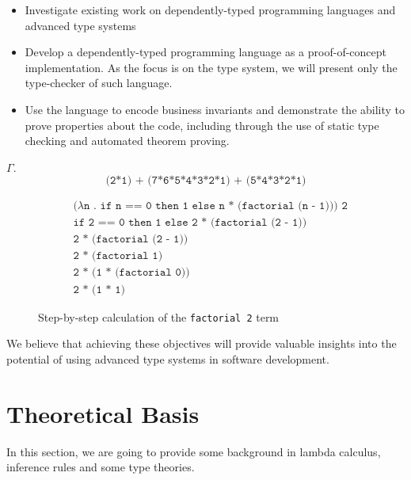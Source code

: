 \documentclass[12pt]{article}
\theoremstyle{definition}
\newcommand{\code}[1]{\texttt{#1}}
\newcommand{\fnarrow}{\rightarrow}
\begin{document}
\begin{itemize}
\item Investigate existing work on dependently-typed programming languages and advanced type systems
\item Develop a dependently-typed programming language as a proof-of-concept implementation. As the focus is on the type system, we will present only the type-checker of such language.
\item Use the language to encode business invariants and demonstrate the ability to prove properties about the code, including through the use of static type checking and automated theorem proving.
\end{itemize}

$\Gamma$.
\begin{equation*}
       \code{(2*1) + (7*6*5*4*3*2*1) + (5*4*3*2*1)}
\end{equation*}

\begin{figure}[H]
       \begin{equation*}
              \begin{aligned}
                     &\code{($\lambda$n . if n == 0 then 1 else n * (factorial (n - 1))) 2} \\
                     &\code{if 2 == 0 then 1 else 2 * (factorial (2 - 1))} \\
                     &\code{2 * (factorial (2 - 1))} \\
                     &\code{2 * (factorial 1)} \\
                     &\code{2 * (1 * (factorial 0))} \\
                     &\code{2 * (1 * 1)} 
              \end{aligned}
       \end{equation*}
       \caption{Step-by-step calculation of the \code{factorial 2} term}
       \label{fig:factorial-calc:step-1}
\end{figure}



We believe that achieving these objectives will provide valuable insights into the potential of using advanced type systems in software development.

\section{Theoretical Basis}

In this section, we are going to provide some background in lambda calculus, inference rules and some type theories.
\end{document}
